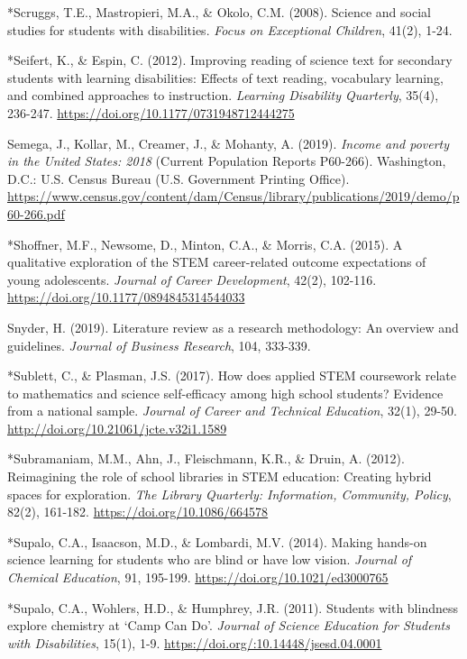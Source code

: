 \documentclass[11pt]{sig-alternate}
\begin{document}
\begin{large}
*Scruggs, T.E., Mastropieri, M.A., \& Okolo, C.M. (2008). Science and social studies for students with disabilities. \textit{Focus on Exceptional Children}, 41(2), 1-24.

*Seifert, K., \& Espin, C. (2012). Improving reading of science text for secondary students with learning disabilities: Effects of text reading, vocabulary learning, and combined approaches to instruction. \textit{Learning Disability Quarterly}, 35(4), 236-247. \url{https://doi.org/10.1177/0731948712444275}

Semega, J., Kollar, M., Creamer, J., \& Mohanty, A. (2019).\textit{ Income and poverty in the United 
States: 2018 }(Current Population Reports P60-266). Washington, D.C.: U.S. Census Bureau (U.S. Government Printing Office). \url{https://www.census.gov/content/dam/Census/library/publications/2019/demo/p60-266.pdf}

*Shoffner, M.F., Newsome, D., Minton, C.A., \& Morris, C.A. (2015). A qualitative exploration of the STEM career-related outcome expectations of young adolescents. \textit{Journal of Career Development}, 42(2), 102-116. \url{https://doi.org/10.1177/0894845314544033}

Snyder, H. (2019). Literature review as a research methodology: An overview and guidelines. \textit{Journal of Business Research}, 104, 333-339.

*Sublett, C., \& Plasman, J.S. (2017). How does applied STEM coursework relate to mathematics  and science self-efficacy among high school students? Evidence from a national sample. \textit{Journal of Career and Technical Education}, 32(1), 29-50. \url{http://doi.org/10.21061/jcte.v32i1.1589}

*Subramaniam, M.M., Ahn, J., Fleischmann, K.R., \& Druin, A. (2012). Reimagining the role of school libraries in STEM education: Creating hybrid spaces for exploration. \textit{The Library Quarterly: Information, Community, Policy}, 82(2), 161-182. \url{https://doi.org/10.1086/664578}

*Supalo, C.A., Isaacson, M.D., \& Lombardi, M.V. (2014). Making hands-on science learning for students who are blind or have low vision. \textit{Journal of Chemical Education}, 91, 195-199. \url{https://doi.org/10.1021/ed3000765}

*Supalo, C.A., Wohlers, H.D., \& Humphrey, J.R. (2011). Students with blindness explore 
chemistry at ‘Camp Can Do’.\textit{ Journal of Science Education for Students with Disabilities}, 15(1), 1-9. \url{https://doi.org/:10.14448/jsesd.04.0001}


\end{large}
\end{document}
